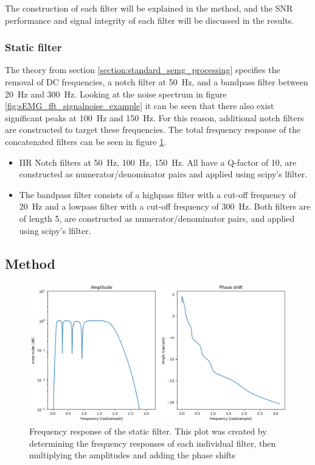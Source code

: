 The construction of each filter will be explained in the method, and the SNR performance and signal integrity of each filter will be discussed in the results. 

\subsubsection{Static filter}
The theory from section \ref{section:standard_semg_processing} specifies the removal of DC frequencies, a notch filter at \SI{50}{Hz}, and a bandpass filter between \SI{20}{Hz} and \SI{300}{Hz}. Looking at the noise spectrum in figure \ref{fig:sEMG_fft_signalnoise_example} it can be seen that there also exist significant peaks at \SI{100}{Hz} and \SI{150}{Hz}. For this reason, additional notch filters are constructed to target these frequencies. The total frequency response of the concatenated filters can be seen in figure \ref{fig:staticfilter_frequencyresponse}.
\begin{itemize}
    \item IIR Notch filters at \SI{50}{Hz}, \SI{100}{Hz}, \SI{150}{Hz}. All have a Q-factor of 10, are constructed as numerator/denominator pairs and applied using scipy's lfilter.
    \item The bandpass filter consists of a highpass filter with a cut-off frequency of \SI{20}{Hz} and a lowpass filter with a cut-off frequency of \SI{300}{Hz}. Both filters are of length 5, are constructed as numerator/denominator pairs, and applied using scipy's lfilter.
\end{itemize}

\subsection{Method}
\begin{figure}[h!t]
	\begin{center}
		\includegraphics[width=1.0\columnwidth]{images/staticfilter_frequencyresponse.png}
	\end{center}
	\caption{Frequency response of the static filter. This plot was created by determining the frequency responses of each individual filter, then multiplying the amplitudes and adding the phase shifts}
	\label{fig:staticfilter_frequencyresponse}
\end{figure}


